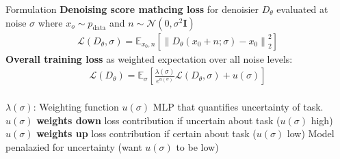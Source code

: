 \documentclass{beamer}
\begin{document}
\begin{frame}[t]{Formulation}
    \textbf{Denoising score mathcing loss} for denoisier $D_\theta$ evaluated at noise $\sigma$ where $x_o \sim p_\text{data}$
    and $n \sim \mathcal{N}(0, \sigma^2 \mathbf{I})$ 
    \begin{gather}\label{eq:2}
        \mathcal{L}(D_\theta, \sigma) = \mathbb{E}_{x_0, n} \left[ \left\| D_\theta(x_0 + n; \sigma) - x_0 \right\|_2^2 \right]
    \end{gather}
    \textbf{Overall training loss} as weighted expectation over all noise levels:
    \begin{gather}\label{eq:3}
        \mathcal{L}(D_\theta) = \mathbb{E}_\sigma \left[ \frac{\lambda(\sigma)}{e^{u(\sigma)}} \mathcal{L}(D_\theta, \sigma)+ u(\sigma) \right] \\
    \end{gather}

    $\lambda(\sigma)$: Weighting function \newline 
    $u(\sigma)$ MLP that quantifies uncertainty of task.\newline
    $u(\sigma)$ \textbf{weights down} loss contribution if uncertain about task ($u(\sigma)$ high)
    $u(\sigma)$ \textbf{weights up} loss contribution if certain about task ($u(\sigma)$ low)
    \newline
    Model penalazied for uncertainty (want $u(\sigma)$ to be low)
\end{frame}
\end{document}
